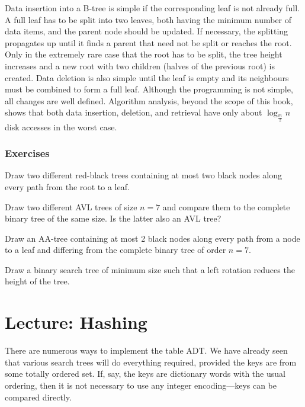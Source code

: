 Data insertion into a B-tree is simple if the corresponding leaf is not
already full. A full leaf has to be split into two leaves, both having
the minimum number of data items, and the parent node should be updated.
If necessary, the splitting propagates up until it finds a parent that
need not be split or reaches the root. Only in the extremely rare case
that the root has to be split, the tree height increases and a new root
with two children (halves of the previous root) is created. Data
deletion is also simple until the leaf is empty and its neighbours must
be combined to form a full leaf. Although the programming is not simple, all
changes are well defined. Algorithm analysis, beyond the scope of this
book, shows that both data insertion,
deletion, and retrieval have only about $\log_{\frac{m}{2}} n$ disk
accesses in the worst case.

\subsection*{Exercises}

\begin{Exercise}\label{exr:redblack:example}
Draw two different red-black trees containing at most two black nodes 
along every path from the root to a leaf.
\end{Exercise}


\begin{Exercise}\label{exr:avl:example}
Draw two different AVL trees of size $n=7$ and compare
them to the complete binary tree of the same size. Is
the latter also an AVL tree?
\end{Exercise}



\begin{Exercise}\label{exr:aa:example}
Draw an AA-tree containing at most 2 black nodes 
along every path from a node to a leaf and differing from
the complete binary tree of order \(n=7\).
\end{Exercise}

\begin{Exercise}\label{exr:rotation}
Draw a binary search tree of minimum size such that a left rotation 
reduces the height of the tree.
\end{Exercise}


\chapter{Lecture: Hashing}
There are numerous ways to implement the table ADT. We have already seen 
that various search trees will do everything required, provided the keys are 
from some totally ordered set. If, say, the keys are dictionary words with the 
usual ordering, then it is not necessary to use any integer encoding---keys can 
be compared directly.

